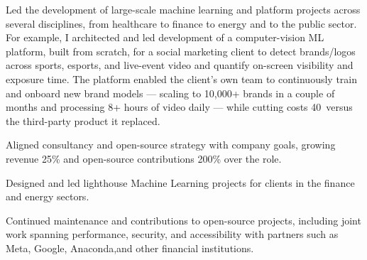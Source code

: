 \begin{cventries}
{\begin{cvitems}
    \item {Led the development of large-scale machine learning and platform projects across several disciplines, from healthcare to finance to energy and to the public sector. For example, I architected and led development of a computer-vision ML platform, built from scratch, for a social marketing client to detect brands/logos across sports, esports, and live-event video and quantify on-screen visibility and exposure time. The platform enabled the client's own team to continuously train and onboard new brand models — scaling to 10,000+ brands in a couple of months and processing 8+ hours of video daily — while cutting costs 40\ versus the third-party product it replaced.
}
    \item {Aligned consultancy and open-source strategy with company goals, growing revenue 25\% and open-source contributions 200\% over the role.}
    \item {Designed and led lighthouse Machine Learning projects for clients in the finance and energy sectors.}
    \item {Continued maintenance and contributions to open-source projects, including joint work spanning performance, security, and accessibility with partners such as Meta, Google, Anaconda,and other financial institutions.}
\end{cvitems}
}


\end{cventries}
